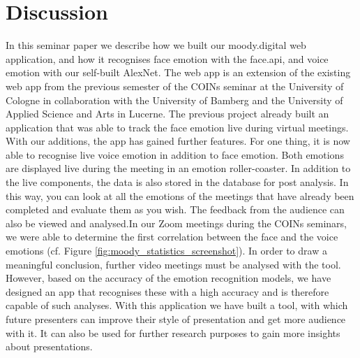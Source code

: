 \section{Discussion}
\label{sec:Discussion}
In this seminar paper we describe how we built our moody.digital web application, and how it recognises face emotion with the face.api, and voice emotion with our self-built AlexNet. The web app is an extension of the existing web app from the previous semester of the COINs seminar at the University of Cologne in collaboration with the University of Bamberg and the University of Applied Science and Arts in Lucerne. The previous project already built an application that was able to track the face emotion live during virtual meetings. With our additions, the app has gained further features. For one thing, it is now able to recognise live voice emotion in addition to face emotion. Both emotions are displayed live during the meeting in an emotion roller-coaster. In addition to the live components, the data is also stored in the database for post analysis. In this way, you can look at all the emotions of the meetings that have already been completed and evaluate them as you wish. The feedback from the audience can also be viewed and analysed.In our Zoom meetings during the COINs seminars, we were able to determine the first correlation between the face and the voice emotions (cf. Figure \ref{fig:moody_statistics_screenshot}). In order to draw a meaningful conclusion, further video meetings must be analysed with the tool. However, based on the accuracy of the emotion recognition models, we have designed an app that recognises these with a high accuracy and is therefore capable of such analyses. 
With this application we have built a tool, with which future presenters can improve their style of presentation and get more audience with it. It can also be used for further research purposes to gain more insights about presentations.
